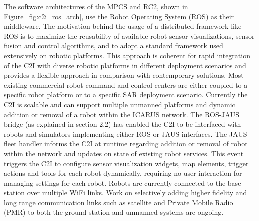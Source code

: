 \documentclass{article}
\begin{document}
The software architectures of the MPCS and RC2, shown in Figure~\ref{fig:c2i_ros_arch}, use the Robot Operating System (ROS) as their middleware.
The motivation behind the usage of a distributed framework like ROS is to maximize the reusability of available robot sensor visualizations, sensor fusion and control algorithms, and to adopt a standard framework used extensively on robotic platforms.
This approach is coherent for rapid integration of the C2I with diverse robotic platforms in different deployment scenarios and provides a flexible approach in comparison with contemporary solutions.
Most existing commercial robot command and control centers are either coupled to a specific robot platform or to a specific SAR deployment scenario.
Currently the C2I is scalable and can support multiple unmanned platforms and dynamic addition or removal of a robot within the ICARUS network.
The ROS-JAUS bridge (as explained in section 2.2) has enabled the C2I to be interfaced with robots and simulators implementing either ROS or JAUS interfaces.
The JAUS fleet handler informs the C2I at runtime regarding addition or removal of robot within the network and updates on state of existing robot services.
This event triggers the C2I to configure sensor visualization widgets, map elements, trigger actions and tools for each robot dynamically, requiring no user interaction for managing settings for each robot.
Robots are currently connected to the base station over multiple WiFi links.
Work on selectively adding higher fidelity and long range communication links such as satellite and Private Mobile Radio (PMR) to both the ground station and unmanned systems are ongoing.
\end{document}
